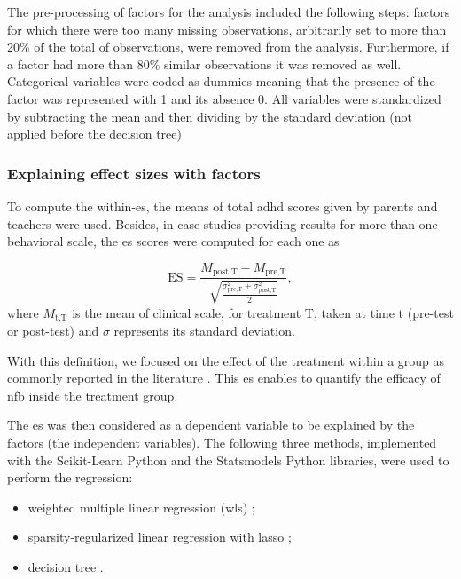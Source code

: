 The pre-processing of factors for the analysis included the following steps: factors for which there were too many 
missing observations, arbitrarily set to more than 20\% of the total of observations, were removed from the analysis. 
Furthermore, if a factor had more than 80\% similar observations it was removed as well. Categorical variables were 
coded as dummies meaning that the presence of the factor was represented with 1 and its absence 0. All variables 
were standardized by subtracting the mean and then dividing by the standard deviation (not applied before the decision tree)

\subsubsection{Explaining effect sizes with factors}

To compute the within-\gls{es}, the  means of total \gls{adhd} scores given by parents and teachers were used. Besides, 
in case studies providing results for more than one behavioral scale, the \gls{es} scores were computed for each one as 

\begin{equation*}
\label{eq:factors_effect_size_within_subject}
\text{ES} = \frac{M_{\text{post,T}} - M_{\text{pre,T}}}{\sqrt{\frac{\sigma_{\text{pre,T}}^2 + \sigma_{\text{post,T}}^2}{2}}},
\end{equation*} 
where $M_{\text{t,T}}$ is the mean of clinical scale, for treatment T, taken at time t (pre-test or post-test) and $\sigma$ represents 
its standard deviation.

With this definition, we focused on the effect of the treatment within a group \citep{Cohen1988} as commonly reported 
in the literature \citep{Arns2009, Maurizio2014, Strehl2017}. This \gls{es} enables to quantify 
the efficacy of \gls{nfb} inside the treatment group. 

The \gls{es} was then considered as a dependent variable to be explained by the factors (the independent variables). 
The following three methods, implemented with the Scikit-Learn Python \citep[version 0.18.1]{Pedregosa2011} and the Statsmodels Python
\citep[version 0.8.0]{Seabold2010} libraries, were used to perform the regression:
\begin{itemize}
  \item weighted multiple linear regression (\gls{wls}) \citep{Montgomery2012};
	\item sparsity-regularized linear regression with \gls{lasso} \citep{Tibshirani1996};
	\item decision tree \citep{Quinlan1986}.
\end{itemize}

